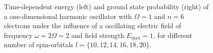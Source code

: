 \begin{figure}[!h]
    \centering
    \caption{Time-dependent energy (left) and ground state probability (right)
        of a one-dimensional harmonic oscillator with $\Omega=1$
        and $n=6$ electrons under the influence of a oscillating electric field 
        of frequency $\omega = 2 \Omega = 2$ and field strength $E_\text{max}=1$,
        for different number of spin-orbitals $l=\{10,12,14,16,18,20\}$.
    }
    \label{fig:1d_n6_qd}
\end{figure}

